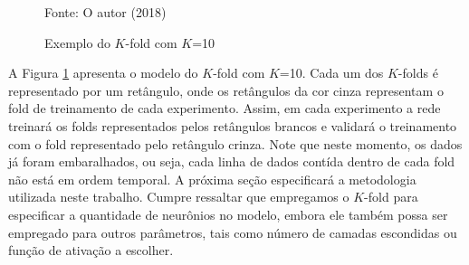   \begin{figure}
    \centering
    \caption[Exemplo do $K$-fold]{Exemplo do $K$-fold com $K$=10}
    \label{fig:k-fold}

    \begin{center}
        Fonte: O autor (2018)
    \end{center}
\end{figure}

  A Figura \ref{fig:k-fold} apresenta o modelo do $K$-fold com $K$=10. Cada um dos $K$-folds é representado por um retângulo, onde os retângulos da cor cinza representam o fold de treinamento de cada experimento. Assim, em cada experimento a rede treinará os folds representados pelos retângulos brancos e validará o treinamento com o fold representado pelo retângulo crinza. Note que neste momento, os dados já foram embaralhados, ou seja, cada linha de dados contída dentro de cada fold não está em ordem temporal.
  A próxima seção especificará a metodologia utilizada neste trabalho. Cumpre ressaltar que empregamos o $K$-fold para especificar a quantidade de neurônios no modelo, embora ele também possa ser empregado para outros parâmetros, tais como número de camadas escondidas ou função de ativação a escolher.

